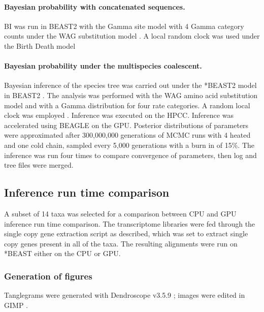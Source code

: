 \documentclass[12pt]{article}
\begin{document}
\paragraph*{Bayesian probability with concatenated sequences.}
BI was run in BEAST2 with the Gamma site model with 4 Gamma category counts under the WAG substitution model \cite{whelan2001general}. A local random clock was used  under the Birth Death model %
 

\paragraph*{Bayesian probability under the multispecies coalescent.}
Bayesian inference of the species tree was carried out under the *BEAST2 model in BEAST2 \cite{bouckaert2014beast}. 
The analysis was performed with the WAG amino acid substitution model \cite{whelan2001general} and with a Gamma distribution for four rate categories. 
A random local clock was employed \cite{drummond2010bayesian}. 
Inference was executed on the HPCC. 
Inference was accelerated using BEAGLE \cite{ayres2011beagle} on the GPU. 
Posterior distributions of parameters were approximated after 300,000,000 generations of MCMC runs with 4 heated and one cold chain, sampled every 5,000 generations  with a burn in of 15\%. 
The inference was run four times to compare convergence of parameters, then log and tree files were merged. 


\subsection*{Inference run time comparison}
A subset of 14 taxa was selected for a comparison between CPU and GPU inference run time comparison. 
The transcriptome libraries were fed through the single copy gene extraction script as described, which was set to extract single copy genes present in all of the taxa. 
The resulting alignments were run on *BEAST either on the CPU or GPU.
\subsubsection*{Generation of figures}
Tanglegrams were generated with Dendroscope v3.5.9 \cite{huson2007dendroscope}; images were edited in GIMP \cite{gimp}.
\newpage
\end{document}
